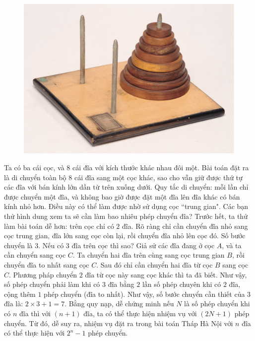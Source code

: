 		\begin{figure}
		\centering
		\captionsetup{labelformat= empty, justification=centering}
		\includegraphics[width=1\linewidth]{2.1}
		\vspace*{-15pt}
	\end{figure}
	Ta có ba cái cọc, và  $8$ cái đĩa với kích thước khác nhau đôi một. Bài toán đặt ra là di chuyển toàn bộ $8$ cái đĩa sang một cọc khác, sao cho vẫn giữ được thứ tự các đĩa với bán kính lớn dần từ trên xuống dưới. Quy tắc di chuyển: mỗi lần chỉ được chuyển một đĩa, và không bao giờ được đặt một đĩa lên đĩa khác có bán kính nhỏ hơn. Điều này có thể làm được nhờ sử dụng cọc ``trung gian".
	\vskip 0.1cm
	Các bạn thử hình dung xem ta sẽ cần làm bao nhiêu phép chuyển đĩa?
	\vskip 0.1cm
	Trước hết, ta thử làm bài toán dễ hơn: trên cọc chỉ có $2$ đĩa. Rõ ràng chỉ cần chuyển đĩa nhỏ sang cọc trung gian, đĩa lớn sang cọc còn lại, rồi chuyển đĩa nhỏ lên cọc đó. Số bước chuyển là $3$.
	\vskip 0.1cm
	Nếu có $3$ đĩa trên cọc thì sao? Giả sử các đĩa đang ở cọc $A$, và ta cần chuyển sang cọc $C$. Ta chuyển hai đĩa trên cùng sang cọc  trung gian $B$, rồi chuyển đĩa to nhất sang cọc $C$. Sau đó chỉ cần chuyển hai đĩa từ cọc $B$ sang cọc $C$. Phương pháp chuyển $2$ đĩa từ cọc này sang cọc khác thì ta đã biết. Như vậy, số phép chuyển phải làm khi có $3$ đĩa bằng $2$ lần số phép chuyên khi có $2$ đĩa, cộng thêm $1$ phép chuyển (đĩa to nhất). 
	\vskip 0.1cm
	Như vậy, số bước chuyển cần thiết của $3$ đĩa là: $2\times 3 + 1 = 7$. Bằng quy nạp, dễ chứng minh nếu $N$ là số phép chuyển khi có $n$ đĩa thì với $(n+1)$ đĩa, ta có thể thực hiện nhiệm vụ với $(2N+1)$ phép chuyển. Từ đó, dễ suy ra, nhiệm vụ đặt ra trong bài toán Tháp Hà Nội với $n$ đĩa có thể thực hiện với $2^n- 1$  phép chuyển.
